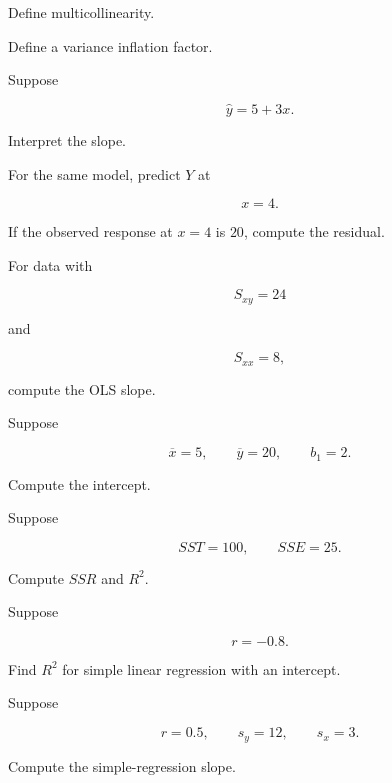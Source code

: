 \begin{exercise}[1]
Define multicollinearity.
\end{exercise}

\begin{exercise}[1]
Define a variance inflation factor.
\end{exercise}

\begin{exercise}[2]
Suppose

\[
\widehat{y}
=
5+3x.
\]

Interpret the slope.
\end{exercise}

\begin{exercise}[2]
For the same model, predict \(Y\) at

\[
x=4.
\]
\end{exercise}

\begin{exercise}[2]
If the observed response at \(x=4\) is \(20\), compute the residual.
\end{exercise}

\begin{exercise}[2]
For data with

\[
S_{xy}=24
\]

and

\[
S_{xx}=8,
\]

compute the OLS slope.
\end{exercise}

\begin{exercise}[2]
Suppose

\[
\overline{x}=5,
\qquad
\overline{y}=20,
\qquad
b_1=2.
\]

Compute the intercept.
\end{exercise}

\begin{exercise}[2]
Suppose

\[
SST=100,
\qquad
SSE=25.
\]

Compute \(SSR\) and \(R^2\).
\end{exercise}

\begin{exercise}[2]
Suppose

\[
r=-0.8.
\]

Find \(R^2\) for simple linear regression with an intercept.
\end{exercise}

\begin{exercise}[2]
Suppose

\[
r=0.5,
\qquad
s_y=12,
\qquad
s_x=3.
\]

Compute the simple-regression slope.
\end{exercise}

